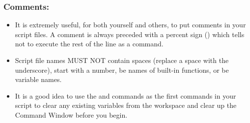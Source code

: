 \newpage


\subsubsection{Comments:}
\begin{itemize}
\item It is extremely useful, for both yourself and others, to put comments in your script files. A comment is always preceded with a percent sign (\mcode{\%}) which tells \mlab not to execute the rest of the line as a command.
\item Script file names MUST NOT contain spaces (replace a space with the underscore), start with a number, be names of built-in functions, or be variable names.
\item It is a good idea to use the  and  commands as the first commands in your script to clear any existing variables from the \mlab workspace and clear up the Command Window before you begin.
\end{itemize}

